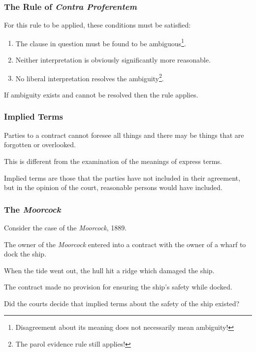 \begin{frame}
\frametitle{The Rule of \textit{Contra Proferentem}}

For this rule to be applied, these conditions must be satisfied:

\begin{enumerate}
	\item The clause in question must be found to be ambiguous\footnote{Disagreement about its meaning does not necessarily mean ambiguity!}.
	\item Neither interpretation is obviously significantly more reasonable.
	\item No liberal interpretation resolves the ambiguity\footnote{The parol evidence rule still applies!}.
\end{enumerate}

If ambiguity exists and cannot be resolved then the rule applies.

\end{frame}



\begin{frame}
\frametitle{Implied Terms}

Parties to a contract cannot foresee all things and there may be things that are forgotten or overlooked.

This is different from the examination of the meanings of express terms.

\alert{Implied terms} are those that the parties have not included in their agreement, but in the opinion of the court, reasonable persons would have included.

\end{frame}



\begin{frame}
\frametitle{The \textit{Moorcock}}

Consider the case of the \textit{Moorcock}, 1889.

The owner of the \textit{Moorcock} entered into a contract with the owner of a wharf to dock the ship.

When the tide went out, the hull hit a ridge which damaged the ship.

The contract made no provision for ensuring the ship's safety while docked.

Did the courts decide that implied terms about the safety of the ship existed?

\end{frame}



